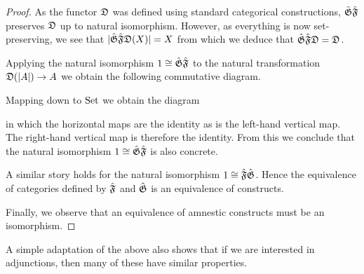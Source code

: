 \documentclass[%
a4paper,%
arxiv,%
defaults
]{myclass}
\begin{document}
\begin{proof}
As the functor \(\func{D}\) was defined using standard categorical constructions, \(\hat{\func{G}}\hat{\func{F}}\) preserves \(\func{D}\) up to natural isomorphism.
However, as everything is now set\hyp{}preserving, we see that \(\sabs{\hat{\func{G}} \hat{\func{F}} \func{D}(X)} = X\) from which we deduce that \(\hat{\func{G}}\hat{\func{F}}\func{D} = \func{D}\).

Applying the natural isomorphism \(1 \cong \hat{\func{G}}\hat{\func{F}}\) to the natural transformation \(\func{D}(\sabs{A}) \to A\) we obtain the following commutative diagram.
%
\begin{centre}
\end{centre}

Mapping down to \(\operatorname{Set}\) we obtain the diagram

\begin{centre}
\end{centre}

in which the horizontal maps are the identity as is the left\hyp{}hand vertical map.
The right\hyp{}hand vertical map is therefore the identity.
From this we conclude that the natural isomorphism \(1 \cong \hat{\func{G}}\hat{\func{F}}\) is also concrete.

A similar story holds for the natural isomorphism \(1 \cong \hat{\func{F}}\hat{\func{G}}\).
Hence the equivalence of categories defined by \(\hat{\func{F}}\) and \(\hat{\func{G}}\) is an equivalence of constructs.

Finally, we observe that an equivalence of amnestic constructs must be an isomorphism.
\end{proof}

A simple adaptation of the above also shows that if we are interested in adjunctions, then many of these have similar properties.
\end{document}
